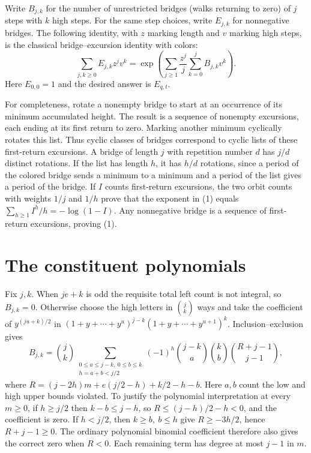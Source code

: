\documentclass[11pt,letterpaper]{article}
\begin{document}
Write \(B_{j,k}\) for the number of unrestricted bridges (walks returning to zero) of \(j\) steps with \(k\) high steps. For the same step choices, write \(E_{j,k}\) for nonnegative bridges. The following identity, with \(z\) marking length and \(v\) marking high steps, is the classical bridge--excursion identity with colors:
\[
 \sum_{j,k\ge0} E_{j,k}z^jv^k
 =\exp\left(\sum_{j\ge1}\frac{z^j}{j}\sum_{k=0}^j B_{j,k}v^k\right). \tag{1}
\]
Here \(E_{0,0}=1\) and the desired answer is \(E_{q,t}\).

For completeness, rotate a nonempty bridge to start at an occurrence of its minimum accumulated height. The result is a sequence of nonempty excursions, each ending at its first return to zero. Marking another minimum cyclically rotates this list. Thus cyclic classes of bridges correspond to cyclic lists of these first-return excursions. A bridge of length \(j\) with repetition number \(d\) has \(j/d\) distinct rotations. If the list has length \(h\), it has \(h/d\) rotations, since a period of the colored bridge sends a minimum to a minimum and a period of the list gives a period of the bridge. If \(I\) counts first-return excursions, the two orbit counts with weights \(1/j\) and \(1/h\) prove that the exponent in (1) equals \(\sum_{h\ge1}I^h/h=-\log(1-I)\). Any nonnegative bridge is a sequence of first-return excursions, proving (1).

\section{The constituent polynomials}
Fix \(j,k\). When \(je+k\) is odd the requisite total left count is not integral, so \(B_{j,k}=0\). Otherwise choose the high letters in \(\binom jk\) ways and take the coefficient of \(y^{(ju+k)/2}\) in
\((1+y+\cdots+y^u)^{j-k}(1+y+\cdots+y^{u+1})^k\).
Inclusion--exclusion gives
\[
 B_{j,k}=\binom jk \!
 \sum_{\substack{0\le a\le j-k,\ 0\le b\le k\\ h=a+b<j/2}}
 (-1)^h\binom{j-k}{a}\binom{k}{b}\binom{R+j-1}{j-1}, \tag{2}
\]
where \(R=(j-2h)m+e(j/2-h)+k/2-h-b\). Here \(a,b\) count the low and high upper bounds violated. To justify the polynomial interpretation at every \(m\ge0\), if \(h\ge j/2\) then \(k-b\le j-h\), so \(R\le(j-h)/2-h<0\), and the coefficient is zero. If \(h<j/2\), then \(k\ge b,\ b\le h\) give \(R\ge-3h/2\), hence \(R+j-1\ge0\). The ordinary polynomial binomial coefficient therefore also gives the correct zero when \(R<0\). Each remaining term has degree at most \(j-1\) in \(m\).
\end{document}
